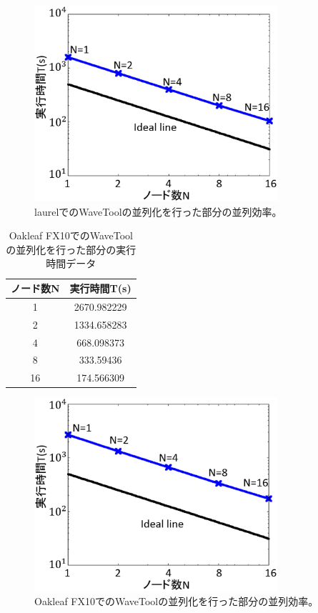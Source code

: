 \documentclass{jsarticle}
\begin{document}
\begin{figure}[H]
\centering
\includegraphics[width=9cm,clip]{fig/laurel_WaveTool.eps}
\caption{laurelでのWaveToolの並列化を行った部分の並列効率。}
\label{fig:pi-01}
\end{figure}

\begin{table}[H]
  \centering
  \caption{Oakleaf FX10でのWaveToolの並列化を行った部分の実行時間データ}
  \label{table:pi-02}

  \begin{tabular}{|c|c|} \hline
   ノード数N & 実行時間T(s) \\ \hline
   1 & 2670.982229 \\ \hline
   2 & 1334.658283 \\ \hline
   4 & 668.098373 \\ \hline
   8 & 333.59436 \\ \hline
  16 & 174.566309 \\ \hline
  \end{tabular}
\end{table}

\begin{figure}[H]
\centering
\includegraphics[width=9cm,clip]{fig/oakleaf_WaveTool.eps}
\caption{Oakleaf FX10でのWaveToolの並列化を行った部分の並列効率。}
\label{fig:pi-01}
\end{figure}
\end{document}
